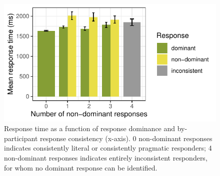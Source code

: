 \documentclass[10pt,letterpaper]{article}
\newcommand{\jd}[1]{\textcolor{Red}{[jd: #1]}}
\newcommand{\lk}[1]{\textcolor{Blue}{[lk: #1]}}
\begin{document}
\begin{figure}
  \centering
    \includegraphics[width=\columnwidth]{plots/consistency}
    \caption{Response time as a function of response dominance and by-participant response consistency (x-axis). 0 non-dominant responses indicates consistently literal or consistently pragmatic responders; 4 non-dominant responses indicates entirely inconsistent responders, for whom no dominant response can be identified.}
    \label{fig:consistency}
  \end{figure}



\end{document}
